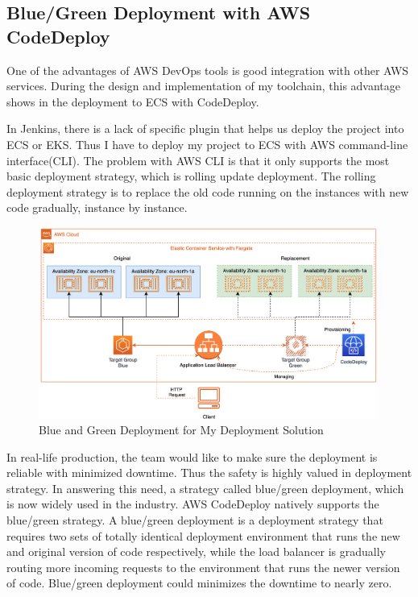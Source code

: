 \subsection{Blue/Green Deployment with AWS CodeDeploy}
One of the advantages of AWS DevOps tools is good integration with other AWS services. During the design and implementation of my toolchain, this advantage shows in the deployment to ECS with CodeDeploy.
\par
In Jenkins, there is a lack of specific plugin that helps us deploy the project into ECS or EKS. Thus I have to deploy my project to ECS with AWS command-line interface(CLI). The problem with AWS CLI is that it only supports the most basic deployment strategy, which is rolling update deployment. The rolling deployment strategy is to replace the old code running on the instances with new code gradually, instance by instance. 
\begin{figure}[h]
 \centering
 \includegraphics[width=0.99\textwidth]{pics/bg.png}
 \caption{Blue and Green Deployment for My Deployment Solution}
 \label{fig:bg}
\end{figure}
\par
In real-life production, the team would like to make sure the deployment is reliable with minimized downtime. Thus the safety is highly valued in deployment strategy. In answering this need, a strategy called blue/green deployment, which is now widely used in the industry. AWS CodeDeploy natively supports the blue/green strategy.
A blue/green deployment is a deployment strategy that requires two sets of totally identical deployment environment that runs the new and original version of code respectively, while the load balancer is gradually routing more incoming requests to the environment that runs the newer version of code. Blue/green deployment could minimizes the downtime to nearly zero\cite{10.1007/978-3-030-45989-5_6}.
